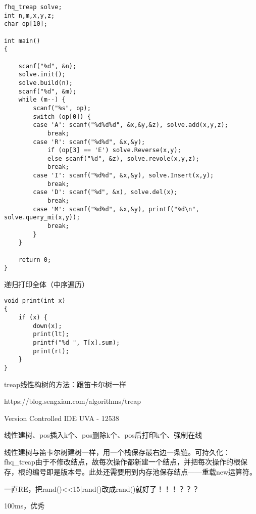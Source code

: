 \begin{lstlisting}
fhq_treap solve;
int n,m,x,y,z;
char op[10];

int main()
{

    scanf("%d", &n);
    solve.init();
    solve.build(n);
    scanf("%d", &m);
    while (m--) {
        scanf("%s", op);
        switch (op[0]) {
        case 'A': scanf("%d%d%d", &x,&y,&z), solve.add(x,y,z);
            break;
        case 'R': scanf("%d%d", &x,&y);
            if (op[3] == 'E') solve.Reverse(x,y);
            else scanf("%d", &z), solve.revole(x,y,z);
            break;
        case 'I': scanf("%d%d", &x,&y), solve.Insert(x,y);
            break;
        case 'D': scanf("%d", &x), solve.del(x);
            break;
        case 'M': scanf("%d%d", &x,&y), printf("%d\n", solve.query_mi(x,y));
            break;
        }
    }

    return 0;
}
\end{lstlisting}

递归打印全体（中序遍历）

\begin{lstlisting}
void print(int x)
{
	if (x) {
		down(x);
		print(lt);
		printf("%d ", T[x].sum);
		print(rt);
	}
}
\end{lstlisting}

treap线性构树的方法：跟笛卡尔树一样

https://blog.sengxian.com/algorithms/treap

Version Controlled IDE UVA - 12538

线性建树、pos插入k个、pos删除k个、pos后打印k个、强制在线

线性建树与笛卡尔树建树一样，用一个栈保存最右边一条链。可持久化：fhq\_treap由于不修改结点，故每次操作都新建一个结点，并把每次操作的根保存，根的编号即是版本号。此处还需要用到内存池保存结点——重载new运算符。

一直RE，把rand()<<15|rand()改成rand()就好了！！！？？？

100ms，优秀

